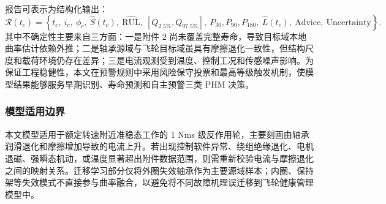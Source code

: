 报告可表示为结构化输出：
\begin{equation}
  \label{eq:q4_report}
  \mathcal R(t_c)=
  \left\{
  t_c,\ i_c,\ \phi_c,\ \hat S(t_c),\
  \widehat{\mathrm{RUL}},\
  [Q_{2.5\%},Q_{97.5\%}],\
  P_{30},P_{90},P_{180},\
  \hat L(t_c),\
  \mathrm{Advice},\
  \mathrm{Uncertainty}
  \right\}.
\end{equation}
其中不确定性主要来自三方面：一是附件 2 尚未覆盖完整寿命，导致目标域本地曲率估计依赖外推；二是轴承源域与飞轮目标域虽具有摩擦退化一致性，但结构尺度和载荷环境仍存在差异；三是电流观测受到温度、控制工况和传感噪声影响。为保证工程稳健性，本文在预警规则中采用风险保守投票和最高等级触发机制，使模型结果能够服务早期识别、寿命预测和自主预警三类 PHM 决策。

\subsubsection{模型适用边界}

本文模型适用于额定转速附近准稳态工作的 1 Nms 级反作用轮，主要刻画由轴承润滑退化和摩擦增加导致的电流上升。若出现控制软件异常、绕组绝缘退化、电机退磁、强瞬态机动，或温度显著超出附件数据范围，则需重新校验电流与摩擦退化之间的映射关系。迁移学习部分仅将外圈失效轴承作为主要源域样本；内圈、保持架等失效模式不直接参与曲率融合，以避免将不同故障机理误迁移到飞轮健康管理模型中。
